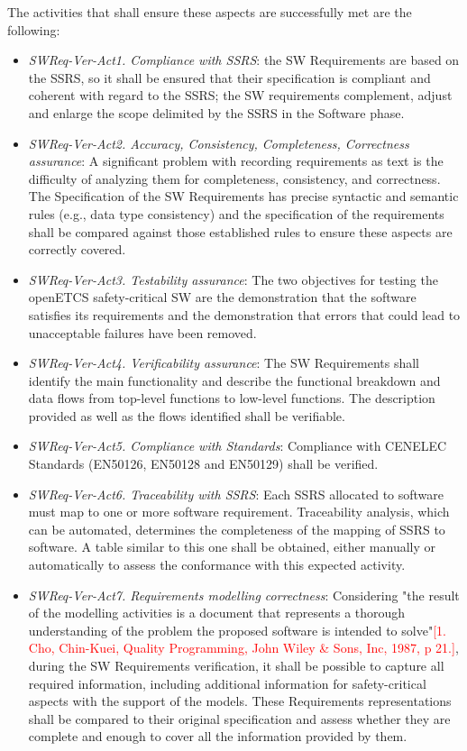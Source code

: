 The activities that shall ensure these aspects are successfully met
are the following:
\begin{itemize}
\item {\it SWReq-Ver-Act1. Compliance with SSRS}: the SW Requirements
  are based on the SSRS, so it shall be ensured that their
  specification is compliant and coherent with regard to the SSRS; the
  SW requirements complement, adjust and enlarge the scope delimited
  by the SSRS in the Software phase.
\item {\it SWReq-Ver-Act2. Accuracy, Consistency, Completeness,
    Correctness assurance}: A significant problem with recording
  requirements as text is the difficulty of analyzing them for
  completeness, consistency, and correctness. The Specification of the
  SW Requirements has precise syntactic and semantic rules (e.g., data
  type consistency) and the specification of the requirements shall be
  compared against those established rules to ensure these aspects are
  correctly covered.
\item {\it SWReq-Ver-Act3. Testability assurance}: The two objectives
  for testing the openETCS safety-critical SW are the demonstration
  that the software satisfies its requirements and the demonstration
  that errors that could lead to unacceptable failures have been
  removed.
\item {\it SWReq-Ver-Act4. Verificability assurance}: The SW
  Requirements shall identify the main functionality and describe the
  functional breakdown and data flows from top-level functions to
  low-level functions. The description provided as well as the flows
  identified shall be verifiable.
\item {\it SWReq-Ver-Act5. Compliance with Standards}: Compliance with
  CENELEC Standards (EN50126, EN50128 and EN50129) shall be verified.
\item {\it SWReq-Ver-Act6. Traceability with SSRS}: Each SSRS
  allocated to software must map to one or more software
  requirement. Traceability analysis, which can be automated,
  determines the completeness of the mapping of SSRS to software. A
  table similar to this one shall be obtained, either manually or
  automatically to assess the conformance with this expected activity.
\item {\it SWReq-Ver-Act7. Requirements modelling correctness}:
  Considering "the result of the modelling activities is a document
  that represents a thorough understanding of the problem the proposed
  software is intended to solve"\textcolor{red}{[1. Cho, Chin-Kuei,
    Quality Programming, John Wiley \& Sons, Inc, 1987, p 21.]},
  during the SW Requirements verification, it shall be possible to
  capture all required information, including additional information
  for safety-critical aspects with the support of the models. These
  Requirements representations shall be compared to their original
  specification and assess whether they are complete and enough to
  cover all the information provided by them.
\end{itemize}

